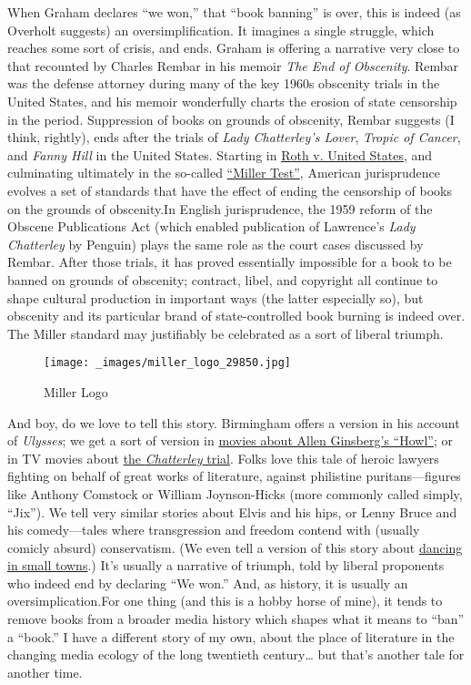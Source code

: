 \documentclass[
  12pt,
]{article}
\begin{document}
When Graham declares ``we won,'' that ``book banning'' is over, this is
indeed (as Overholt suggests) an oversimplification. It imagines a
single struggle, which reaches some sort of crisis, and ends. Graham is
offering a narrative very close to that recounted by Charles Rembar in
his memoir \emph{The End of Obscenity}. Rembar was the defense attorney
during many of the key 1960s obscenity trials in the United States, and
his memoir wonderfully charts the erosion of state censorship in the
period. Suppression of books on grounds of obscenity, Rembar suggests (I
think, rightly), ends after the trials of \emph{Lady Chatterley's
Lover}, \emph{Tropic of Cancer}, and \emph{Fanny Hill} in the United
States. Starting in
\href{http://www.oyez.org/cases/1950-1959/1956/1956_582}{Roth v. United
States}, and culminating ultimately in the so-called
\href{http://en.wikipedia.org/wiki/Miller_test}{``Miller Test''},
American jurisprudence evolves a set of standards that have the effect
of ending the censorship of books on the grounds of obscenity.{In
English jurisprudence, the 1959 reform of the Obscene Publications Act
(which enabled publication of Lawrence's \emph{Lady Chatterley} by
Penguin) plays the same role as the court cases discussed by Rembar.}
After those trials, it has proved essentially impossible for a book to
be banned on grounds of obscenity; contract, libel, and copyright all
continue to shape cultural production in important ways (the latter
especially so), but obscenity and its particular brand of
state-controlled book burning is indeed over. The Miller standard may
justifiably be celebrated as a sort of liberal triumph.

\par\begin{figure}\centering\texttt{[image: \_images/miller\_logo\_29850.jpg]}\caption{Miller Logo}\end{figure}

And boy, do we love to tell this story. Birmingham offers a version in
his account of \emph{Ulysses}; we get a sort of version in
\href{http://www.imdb.com/title/tt1049402/}{movies about Allen
Ginsberg's ``Howl''}; or in TV movies about
\href{http://www.imdb.com/title/tt0757175/}{the \emph{Chatterley}
trial}. Folks love this tale of heroic lawyers fighting on behalf of
great works of literature, against philistine puritans---figures like
Anthony Comstock or William Joynson-Hicks (more commonly called simply,
``Jix''). We tell very similar stories about Elvis and his hips, or
Lenny Bruce and his comedy---tales where transgression and freedom
contend with (usually comicly absurd) conservatism. (We even tell a
version of this story about
\href{https://en.wikipedia.org/wiki/Footloose_(1984_film)}{dancing in
small towns}.) It's usually a narrative of triumph, told by liberal
proponents who indeed end by declaring ``We won.'' And, as history, it
is usually an oversimplication.{For one thing (and this is a hobby horse
of mine), it tends to remove books from a broader media history which
shapes what it means to ``ban'' a ``book.'' I have a different story of
my own, about the place of literature in the changing media ecology of
the long twentieth century\ldots{} but that's another tale for another
time.}
\end{document}
